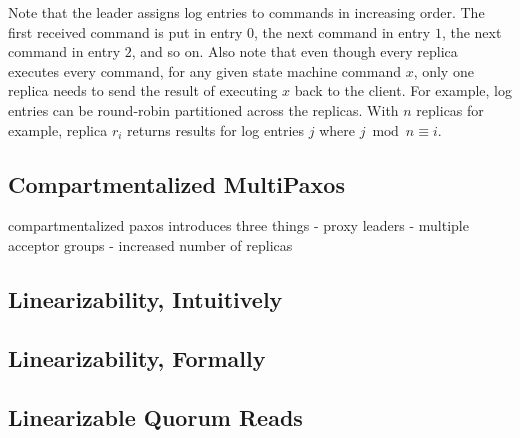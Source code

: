 Note that the leader assigns log entries to commands in increasing order. The
first received command is put in entry $0$, the next command in entry $1$, the
next command in entry $2$, and so on.
%
Also note that even though every replica executes every command, for any given
state machine command $x$, only one replica needs to send the result of
executing $x$ back to the client. For example, log entries can be round-robin
partitioned across the replicas. With $n$ replicas for example, replica $r_i$
returns results for log entries $j$ where $j \bmod n \equiv i$.

\subsection{Compartmentalized MultiPaxos}

compartmentalized paxos introduces three things
- proxy leaders
- multiple acceptor groups
- increased number of replicas

\subsection{Linearizability, Intuitively}

\subsection{Linearizability, Formally}

\subsection{Linearizable Quorum Reads}
